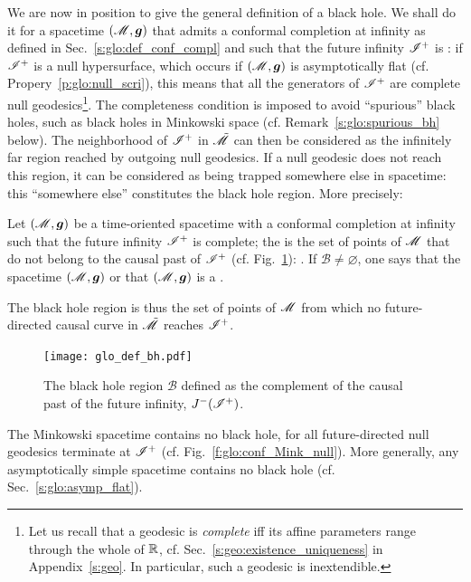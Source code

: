 We are now in position to give the general definition of a black hole.
We shall do it for a spacetime $(\mathscr{M},\bm{g})$ that admits a conformal completion
at infinity as defined in Sec.~\ref{s:glo:def_conf_compl} and
such that the future infinity $\mathscr{I}^+$ is
: if $\mathscr{I}^+$
is a null hypersurface, which occurs if $(\mathscr{M},\bm{g})$ is asymptotically flat
(cf. Propery~\ref{p:glo:null_scri}),
this means that all the generators of $\mathscr{I}^+$ are complete null geodesics\footnote{Let us recall
that a geodesic is \emph{complete} iff its affine parameters range through the whole of
$\mathbb{R}$, cf. Sec.~\ref{s:geo:existence_uniqueness}
in Appendix~\ref{s:geo}. In particular, such a geodesic is inextendible.}.
The completeness condition is imposed to avoid ``spurious'' black holes,
such as black holes in Minkowski space (cf. Remark~\ref{s:glo:spurious_bh} below).
The neighborhood of $\mathscr{I}^+$
in $\tilde{\mathscr{M}}$ can then be considered as the infinitely far region
reached by outgoing null geodesics. If a null geodesic does not reach this
region, it can be considered as being trapped somewhere else in spacetime: this
``somewhere else'' constitutes the black hole region. More precisely:

\begin{greybox}
Let $(\mathscr{M},\bm{g})$ be a time-oriented spacetime with a conformal completion at infinity
such that the future infinity $\mathscr{I}^+$ is complete;
the 
is the set of points of $\mathscr{M}$ that do not belong to the causal past of $\mathscr{I}^+$ (cf. Fig.~\ref{f:glo:def_bh}):
\be \label{e:glo:def_BH}
     .
\ee
If $\mathscr{B} \neq \varnothing$, one says
that the spacetime $(\mathscr{M},\bm{g})$  or that
$(\mathscr{M},\bm{g})$ is a .
\end{greybox}
The black hole region is thus the set of points of $\mathscr{M}$
from which no future-directed causal curve in $\tilde{\mathscr{M}}$ reaches $\mathscr{I}^+$.


\begin{figure}
\centerline{\texttt{[image: glo\_def\_bh.pdf]}}
\caption[]{\label{f:glo:def_bh} \footnotesize
The black hole region $\mathscr{B}$ defined as the complement of
the causal past of the future infinity, $J^-(\mathscr{I}^+)$.}
\end{figure}


\begin{example}
The Minkowski spacetime contains no black hole, for all future-directed null geodesics
terminate at $\mathscr{I}^+$ (cf. Fig.~\ref{f:glo:conf_Mink_null}).
More generally, any asymptotically simple spacetime contains no black hole
(cf. Sec.~\ref{s:glo:asymp_flat}).
\end{example}

